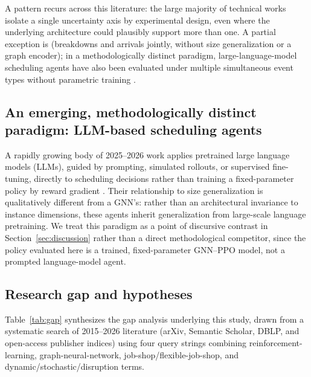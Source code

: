 \documentclass[11pt]{article}
\begin{document}
A pattern recurs across this literature: the large majority of technical works isolate a single uncertainty axis by experimental design, even where the underlying architecture could plausibly support more than one. A partial exception is \citet{lassoued2026} (breakdowns and arrivals jointly, without size generalization or a graph encoder); in a methodologically distinct paradigm, large-language-model scheduling agents have also been evaluated under multiple simultaneous event types without parametric training \citep{cao2025reflecsched}.

\subsection{An emerging, methodologically distinct paradigm: LLM-based scheduling agents}

A rapidly growing body of 2025--2026 work applies pretrained large language models (LLMs), guided by prompting, simulated rollouts, or supervised fine-tuning, directly to scheduling decisions rather than training a fixed-parameter policy by reward gradient \citep{abgaryan2025starjob,cao2025reflecsched}. Their relationship to size generalization is qualitatively different from a GNN's: rather than an architectural invariance to instance dimensions, these agents inherit generalization from large-scale language pretraining. We treat this paradigm as a point of discursive contrast in Section~\ref{sec:discussion} rather than a direct methodological competitor, since the policy evaluated here is a trained, fixed-parameter GNN--PPO model, not a prompted language-model agent.

\subsection{Research gap and hypotheses}
\label{sec:gap}

Table~\ref{tab:gap} synthesizes the gap analysis underlying this study, drawn from a systematic search of 2015--2026 literature (arXiv, Semantic Scholar, DBLP, and open-access publisher indices) using four query strings combining reinforcement-learning, graph-neural-network, job-shop/flexible-job-shop, and dynamic/stochastic/disruption terms.
\end{document}
